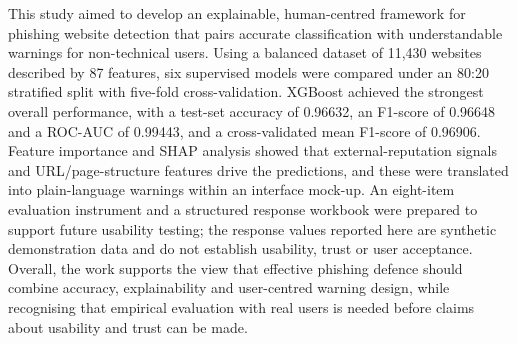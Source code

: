 \documentclass[11pt,a4paper]{article}
\begin{document}
This study aimed to develop an explainable, human-centred framework for phishing website
detection that pairs accurate classification with understandable warnings for non-technical
users. Using a balanced dataset of 11{,}430 websites described by 87 features, six supervised
models were compared under an 80:20 stratified split with five-fold cross-validation. XGBoost
achieved the strongest overall performance, with a test-set accuracy of 0.96632, an F1-score of
0.96648 and a ROC-AUC of 0.99443, and a cross-validated mean F1-score of 0.96906. Feature
importance and SHAP analysis showed that external-reputation signals and URL/page-structure
features drive the predictions, and these were translated into plain-language warnings within an
interface mock-up. An eight-item evaluation instrument and a structured response workbook were
prepared to support future usability testing; the response values reported here are synthetic
demonstration data and do not establish usability, trust or user acceptance. Overall, the work
supports the view that effective phishing defence should combine accuracy, explainability and
user-centred warning design, while recognising that empirical evaluation with real users is
needed before claims about usability and trust can be made.
\end{document}
